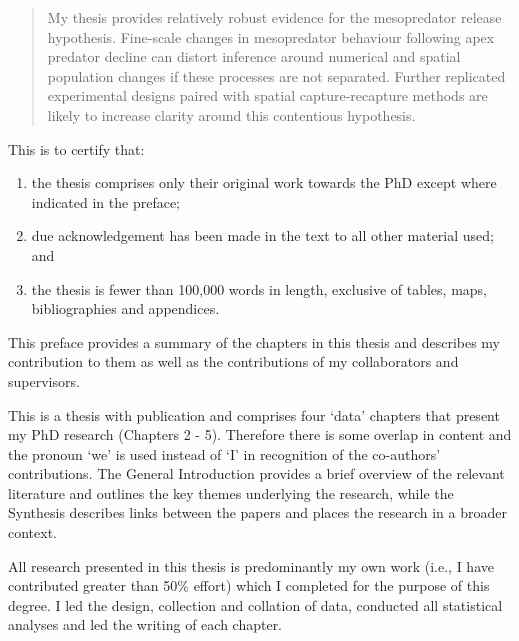 \documentclass[11pt,a4paper,titlepage,twoside,openright]{style/unimelbthesis}
\begin{document}
\begin{frontmatter}
\begin{abstract}
    My thesis provides relatively robust evidence for the mesopredator release hypothesis. Fine-scale changes in mesopredator behaviour following apex predator decline can distort inference around numerical and spatial population changes if these processes are not separated. Further replicated experimental designs paired with spatial capture-recapture methods are likely to increase clarity around this contentious hypothesis.
  \end{abstract}
  \begin{declaration}
    This is to certify that:
    \begin{enumerate}
    \def\labelenumi{\roman{enumi}.}
    \tightlist
    \item
      the thesis comprises only their original work towards the PhD except where indicated in the preface;
    \item
      due acknowledgement has been made in the text to all other material
      used; and
    \item
      the thesis is fewer than 100,000 words in length, exclusive of
      tables, maps, bibliographies and appendices.
    \end{enumerate}
  \end{declaration}
  \begin{preface}
    This preface provides a summary of the chapters in this thesis and describes my contribution to them as well as the contributions of my collaborators and supervisors.
    
    This is a thesis with publication and comprises four `data' chapters that present my PhD research (Chapters 2 - 5). Therefore there is some overlap in content and the pronoun `we' is used instead of `I' in recognition of the co-authors' contributions. The General Introduction provides a brief overview of the relevant literature and outlines the key themes underlying the research, while the Synthesis describes links between the papers and places the research in a broader context.
    
    All research presented in this thesis is predominantly my own work (i.e., I have contributed greater than 50\% effort) which I completed for the purpose of this degree. I led the design, collection and collation of data, conducted all statistical analyses and led the writing of each chapter.
    

\end{preface}
\end{frontmatter}
\end{document}
